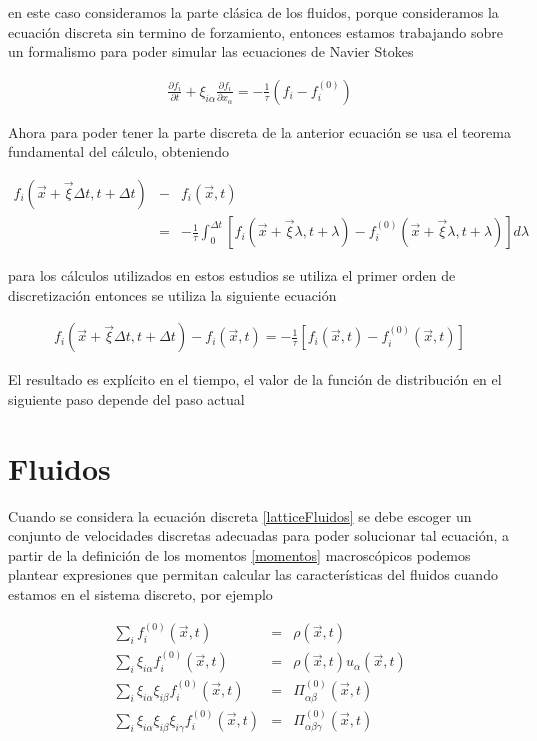 \noindent en este caso consideramos la parte clásica de los fluidos, porque consideramos la ecuación discreta sin termino de forzamiento, entonces estamos trabajando sobre un formalismo para poder simular las ecuaciones de Navier Stokes 

\begin{eqnarray}
\label{latticeFluidos}
\boxed{\frac{\partial f_{i}}{\partial t}+\xi_{i\alpha}\frac{\partial f_{i}}{\partial x_{\alpha}}=-\frac{1}{\tau}\left(f_{i}-f_{i}^{(0)}\right)}
\end{eqnarray}

Ahora para poder tener la parte discreta de la anterior ecuación se usa el teorema fundamental del cálculo, obteniendo 

\begin{eqnarray}
f_{i}(\vec{x}+\vec{\xi}\Delta t, t + \Delta t)&-&f_{i}(\vec{x},t) \nonumber\\
&=&- \frac{1}{\tau}\int_{0}^{\Delta t}[f_{i}(\vec{x}+\vec{\xi}\lambda, t + \lambda)-f_{i}^{(0)}(\vec{x}+\vec{\xi}\lambda, t + \lambda)]d\lambda
\end{eqnarray}

\noindent para los cálculos utilizados en estos estudios se utiliza el primer orden de discretización entonces se utiliza la siguiente ecuación 


\begin{eqnarray}
\label{LBdiscreta}
f_{i}(\vec{x}+\vec{\xi}\Delta t, t + \Delta t)-f_{i}(\vec{x},t)  
=- \frac{1}{\tau}[f_{i}(\vec{x}, t)-f_{i}^{(0)}(\vec{x}, t)]
\end{eqnarray}


El resultado es explícito en el tiempo, el valor de la función de distribución en el siguiente paso depende del paso actual



\section{Fluidos}

Cuando se considera la ecuación discreta \eqref{latticeFluidos} se debe escoger un conjunto de velocidades discretas adecuadas para poder solucionar tal ecuación, a partir de la definición de los momentos \eqref{momentos} macroscópicos podemos plantear expresiones que permitan calcular las características del fluidos cuando estamos en el sistema discreto, por ejemplo 

\begin{eqnarray}
\label{densidad}
\sum_{i}f_{i}^{(0)}(\vec{x},t) &=& \rho(\vec{x},t)\\
\label{momento}
\sum_{i}\xi_{i\alpha}f_{i}^{(0)}(\vec{x},t) &=& \rho(\vec{x},t)u_{\alpha}(\vec{x},t)\\
\label{momento2}
\sum_{i}\xi_{i\alpha}\xi_{i\beta}f_{i}^{(0)}(\vec{x},t) &=& \Pi_{\alpha\beta}^{(0)}(\vec{x},t)\\
\label{momento3}
\sum_{i}\xi_{i\alpha}\xi_{i\beta}\xi_{i\gamma}f_{i}^{(0)}(\vec{x},t) &=& \Pi_{\alpha\beta\gamma}^{(0)}(\vec{x},t)
\end{eqnarray}

